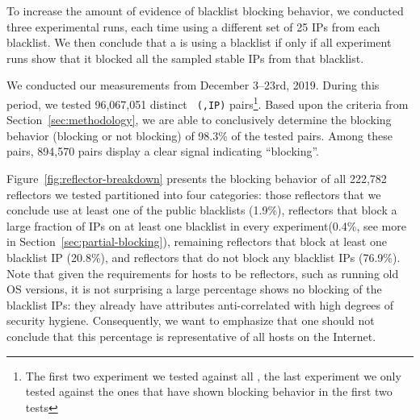 
To increase the amount of evidence of blacklist blocking behavior, we
conducted three experimental runs, each time using a different set of 25
IPs from each blacklist.
We then conclude that a {} is using a blacklist if only if
all experiment runs show that it blocked all the sampled stable IPs
from that blacklist.



We conducted our measurements from December 3--23rd, 2019.  During
this period, we tested 96,067,051 distinct \texttt{\small
  ({},IP)} pairs\footnote{The first two experiment we tested against
  all {}, the last experiment we only tested against the ones that
  have shown blocking behavior in the first two tests}.
Based upon the criteria from
Section~\ref{sec:methodology}, we are able to conclusively determine
the blocking behavior (blocking or not blocking) of 98.3\% of the
tested pairs.  Among these pairs, 894,570 pairs display a
clear signal indicating ``blocking''.

Figure~\ref{fig:reflector-breakdown} presents the blocking behavior of
all 222,782 reflectors we tested partitioned into four categories:
those reflectors that we conclude use at least one of the public
blacklists (1.9\%), reflectors that block a large fraction of IPs on
at least one blacklist in every experiment(0.4\%, see more in
Section~\ref{sec:partial-blocking}), remaining reflectors that block at
least one blacklist IP (20.8\%), and reflectors that do not block any
blacklist IPs (76.9\%).  Note that given the requirements for hosts to
be reflectors, such as running old OS versions, it is not surprising a
large percentage shows no blocking of the blacklist IPs: they already
have attributes anti-correlated with high degrees of security hygiene.
Consequently, we want to emphasize that one should not conclude that
this percentage is representative of all hosts on the Internet.

